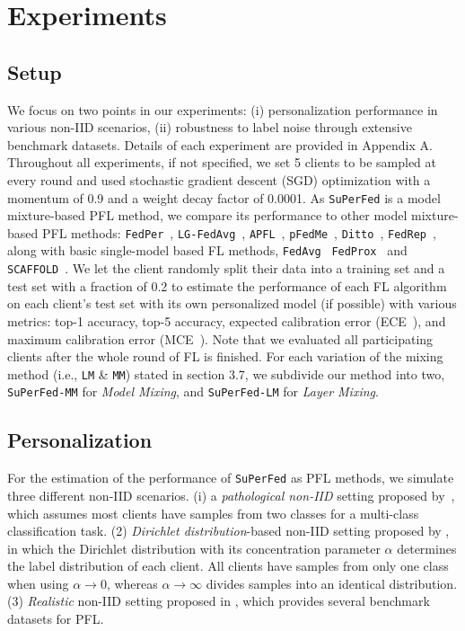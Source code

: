 \documentclass[sigconf]{acmart}
\begin{document}
\section{Experiments}
\subsection{Setup} We focus on two points in our experiments: (i) personalization performance in various non-IID scenarios, (ii) robustness to label noise through extensive benchmark datasets. Details of each experiment are provided in Appendix A. Throughout all experiments, if not specified, we set 5 clients to be sampled at every round and used stochastic gradient descent (SGD) optimization with a momentum of 0.9 and a weight decay factor of 0.0001. 
As \texttt{SuPerFed} is a model mixture-based PFL method, we compare its performance to other model mixture-based PFL methods: \texttt{FedPer}~\cite{FedPer}, \texttt{LG-FedAvg}~\cite{lgfedavg}, \texttt{APFL}~\cite{apfl}, \texttt{pFedMe}~\cite{pfedme}, \texttt{Ditto}~\cite{ditto}, \texttt{FedRep}~\cite{fedrep}, along with basic single-model based FL methods, \texttt{FedAvg}~\cite{mc+17} \texttt{FedProx}~\cite{fedprox} and \texttt{SCAFFOLD}~\cite{ka+19}.
We let the client randomly split their data into a training set and a test set with a fraction of 0.2 to estimate the performance of each FL algorithm on each client's test set with its own personalized model (if possible) with various metrics: top-1 accuracy, top-5 accuracy, expected calibration error (ECE~\cite{ece}), and maximum calibration error (MCE~\cite{mce}). Note that we evaluated all participating clients after the whole round of FL is finished. For each variation of the mixing method (i.e., \texttt{LM} \& \texttt{MM}) stated in section 3.7, we subdivide our method into two, \texttt{SuPerFed-MM} for \textit{Model Mixing}, and \texttt{SuPerFed-LM} for \textit{Layer Mixing}.

\subsection{Personalization} For the estimation of the performance of \texttt{SuPerFed} as PFL methods, we simulate three different non-IID scenarios. (i) a \textit{pathological non-IID} setting proposed by~\cite{mc+17}, which assumes most clients have samples from two classes for a multi-class classification task. (2) \textit{Dirichlet distribution}-based non-IID setting proposed by \cite{diri}, in which the Dirichlet distribution with its concentration parameter $\alpha$ determines the label distribution of each client. All clients have samples from only one class when using $\alpha\rightarrow0$, whereas $\alpha\rightarrow\infty$ divides samples into an identical distribution. (3) \textit{Realistic} non-IID setting proposed in \cite{leaf}, which provides several benchmark datasets for PFL.
\end{document}
